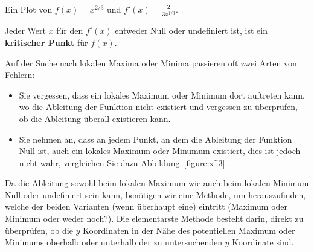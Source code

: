 \begin{marginfigure}[0in]
\caption{Ein Plot von $f(x) = x^{2/3}$ und $f'(x) = \frac{2}{3x^{1/3}}$.}
\label{figure:x^{2/3}}
\end{marginfigure}

\begin{definition}
Jeder Wert $x$ für den $f'(x)$ entweder Null oder undefiniert ist, ist ein 
\textbf{kritischer Punkt} für $f(x)$.
\end{definition}

\begin{warning} 
Auf der Suche nach lokalen Maxima oder Minima passieren oft zwei Arten von Fehlern:
\begin{itemize}
\item Sie vergessen, dass ein lokales Maximum oder Minimum dort auftreten kann, wo die Ableitung der Funktion nicht existiert und vergessen zu überprüfen, ob die Ableitung überall existieren kann.
\item Sie nehmen an, dass an jedem Punkt, an dem die Ableitung der Funktion Null ist, auch ein lokales Maximum oder Minumum existiert, dies ist jedoch nicht wahr, vergleichen Sie dazu Abbildung~\ref{figure:x^3}.
\end{itemize}
\end{warning}


Da die Ableitung sowohl beim lokalen Maximum wie auch beim lokalen Minimum Null oder undefiniert sein kann, benötigen wir eine Methode, um herauszufinden, welche der beiden Varianten (wenn überhaupt eine) eintritt (Maximum oder Minimum oder weder noch?). Die elementarste Methode besteht darin, direkt zu überprüfen, ob die $y$ Koordinaten in der Nähe des potentiellen Maximum oder Minimums oberhalb oder unterhalb der zu untersuchenden $y$ Koordinate sind.

